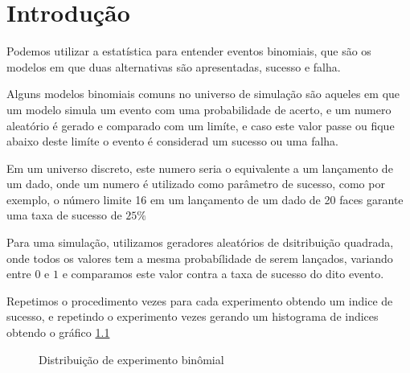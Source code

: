\chapter{Introdu\c{c}\~{a}o}
Podemos utilizar a estat\'{i}stica para entender eventos binomiais, que s\~{a}o os modelos
em que duas alternativas s\~{a}o apresentadas, sucesso e falha.

Alguns modelos binomiais comuns no universo de simula\c{c}\~{a}o
s\~{a}o aqueles em que um modelo simula um evento com uma probabilidade de acerto,
e um numero aleat\'{o}rio \'{e} gerado e comparado com um lim\'{i}te, e caso este valor passe ou
fique abaixo deste lim\'{i}te o evento \'{e} considerad um sucesso ou uma falha.

Em um universo discreto, este numero seria o equivalente a um lan\c{c}amento de um dado,
onde um numero \'{e} utilizado como par\^{a}metro de sucesso, como por exemplo, o número limite 16
em um lan\c{c}amento de um dado de 20 faces garante uma taxa de sucesso de $25\%$

Para uma simula\c{c}\~{a}o, utilizamos geradores aleat\'{o}rios de dsitribui\c{c}\~{a}o quadrada, onde
todos os valores tem a mesma probabílidade de serem lan\c{c}ados, variando entre $0$ e $1$
e comparamos este valor contra a taxa de sucesso do dito evento.

Repetimos o procedimento \introexperimentsize{} vezes para cada experimento obtendo um indice de sucesso,
e repetindo o experimento \introexperimentrepeats{} vezes gerando um histograma de indices obtendo o gr\'{a}fico
\ref{intro:binomial}

\begin{center}
\begin{figure}[!htb]
\begin{center}
\caption{Distribui\c{c}\~ao de experimento bin\^omial}
\label{intro:binomial}
\end{center}
\end{figure}
\end{center}
